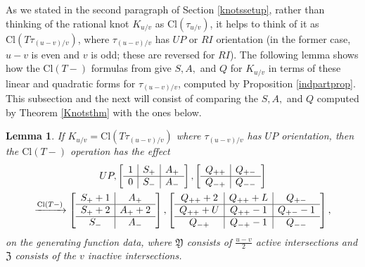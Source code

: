 \documentclass[11pt]{amsart}
\theoremstyle{plain}
\newtheorem{lemmaN}[theoremN]{Lemma}
\theoremstyle{definition}
\theoremstyle{remark}
\begin{document}
As we stated in the second paragraph of Section \ref{knotssetup}, rather than thinking of the rational knot $K_{u/v}$ as $\text{Cl}(\tau_{u/v})$, it helps to think of it as $\text{Cl}(T\tau_{(u-v)/v})$, where $\tau_{(u-v)/v}$ has $UP$ or $RI$ orientation (in the former case, $u-v$ is even and $v$ is odd; these are reversed for $RI$). The following lemma shows how the $\text{Cl}(T-)$ formulas from \cite{SW21} give $S,A,$ and $Q$ for $K_{u/v}$ in terms of these linear and quadratic forms for $\tau_{(u-v)/v}$, computed by Proposition \ref{indpartprop}.
This subsection and the next will consist of comparing the $S,A,$ and $Q$ computed by Theorem \ref{Knotsthm} with the ones below.

\begin{lemmaN}
\label{WSclosureformula}
    If $K_{u/v}=\text{Cl}(T\tau_{(u-v)/v})$ where $\tau_{(u-v)/v}$ has $UP$ orientation, then the $\text{Cl}(T-)$ operation has the effect
   \begin{multline*}
      UP, \left[\begin{array}{ c| c | c  }
    1 & S_+ & A_+  \\
    \hline
    0 & S_- & A_- 
  \end{array}\right],  
  \left[\begin{array}{ c |c }
    Q_{++} & Q_{+-} \\
    \hline
    Q_{-+} & Q_{--}
  \end{array}\right]
  \\
    \xrightarrow{\text{Cl}(T-)}
    \left[\begin{array}{ c | c  }
    S_++1 & A_+  \\
    \hline
    S_++2 & A_+ +2 \\
    \hline
    S_- & A_- 
  \end{array}\right], 
  \left[\begin{array}{ c | c | c}
    Q_{++}+2 & Q_{++}+L & Q_{+-} \\
    \hline
    Q_{++}+U & Q_{++}-1 & Q_{+-}-1\\
    \hline
    Q_{-+} & Q_{-+}-1 & Q_{--}
  \end{array}\right],
   \end{multline*}
   on the generating function data, where $\mathfrak{Y}$ consists of $\frac{u-v}{2}$ active intersections and $\mathfrak{Z}$ consists of the $v$ inactive intersections.


\end{lemmaN}
\end{document}
